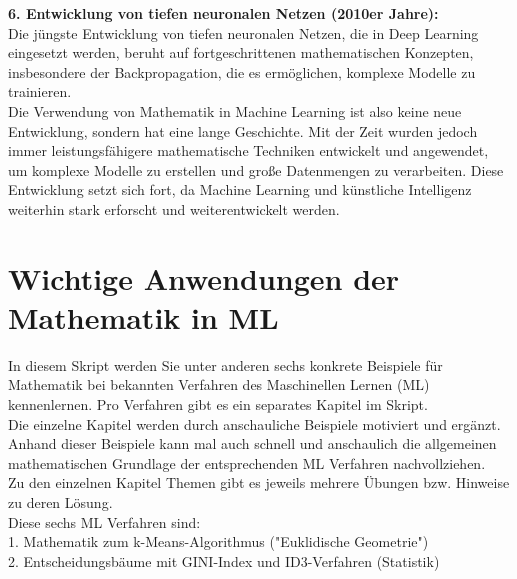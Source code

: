 \documentclass[12pt]{article}
\begin{document}
\textbf{6. Entwicklung von tiefen neuronalen Netzen (2010er Jahre):}\\
Die jüngste Entwicklung von tiefen neuronalen Netzen, die in Deep Learning eingesetzt werden, beruht auf fortgeschrittenen mathematischen Konzepten, insbesondere der Backpropagation, die es ermöglichen, komplexe Modelle zu trainieren.\\[0.3cm]
%
Die Verwendung von Mathematik in Machine Learning ist also keine neue Entwicklung, sondern hat eine lange Geschichte. Mit der Zeit wurden jedoch immer leistungsfähigere mathematische Techniken entwickelt und angewendet, um komplexe Modelle zu erstellen und große Datenmengen zu verarbeiten. Diese Entwicklung setzt sich fort, da Machine Learning und künstliche Intelligenz weiterhin stark erforscht und weiterentwickelt werden.
\\[0.2cm]
%
\newpage
%
\section{Wichtige Anwendungen der Mathematik in ML}

In diesem Skript werden Sie unter anderen sechs konkrete Beispiele für Mathematik bei bekannten Verfahren des Maschinellen Lernen (ML) kennenlernen. Pro Verfahren gibt es ein separates Kapitel im Skript.\\
Die einzelne Kapitel werden durch anschauliche Beispiele motiviert und  ergänzt. Anhand dieser Beispiele kann mal auch schnell und anschaulich die allgemeinen mathematischen Grundlage der entsprechenden ML Verfahren nachvollziehen.\\
Zu den einzelnen Kapitel Themen gibt es jeweils mehrere Übungen bzw. Hinweise zu deren Lösung.\\
Diese sechs ML Verfahren sind:\\


1. Mathematik zum k-Means-Algorithmus ("Euklidische Geometrie")\\

2. Entscheidungsbäume mit GINI-Index und ID3-Verfahren (Statistik)\\
\end{document}
